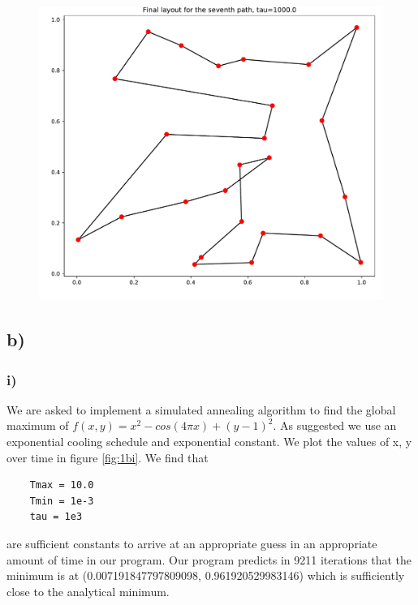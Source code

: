 \documentclass{article}
\begin{document}
 \begin{figure}[H]
     \centerline{\includegraphics[scale=0.6]{images/Q1a_path7_tau1000.pdf}}
     \label{fig:1a_path7_tau1000}
 \end{figure}

\subsection*{b)}
\subsubsection*{i)}
We are asked to implement a simulated annealing algorithm to find the global maximum of $f(x, y) = x^2 - cos(4 \pi x) + (y - 1)^2$. As suggested we use an exponential cooling schedule and exponential constant. We plot the values of x, y over time in figure \ref{fig:1bi}. We find that 
\begin{verbatim}
    Tmax = 10.0
    Tmin = 1e-3
    tau = 1e3    
\end{verbatim}
are sufficient constants to arrive at an appropriate guess in an appropriate amount of time in our program. Our program predicts in 9211 iterations that the minimum is at (0.007191847797809098, 0.961920529983146) which is sufficiently close to the analytical minimum. 
\end{document}
